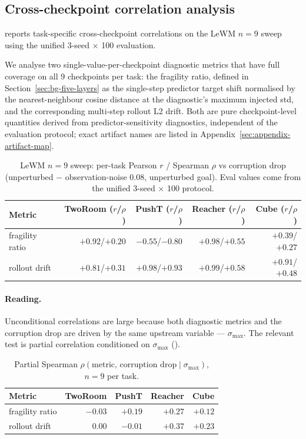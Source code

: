 \documentclass[10pt]{article}
\newcommand{\stdmax}{\ensuremath{\sigma_{\max}}}
\newcommand{\fragility}{fragility ratio}
\begin{document}
\subsection{Cross-checkpoint correlation analysis}\label{sec:diag-cross}

 reports task-specific cross-checkpoint correlations on the LeWM $n = 9$ sweep using the unified 3-seed $\times$ 100 evaluation.

We analyse two single-value-per-checkpoint diagnostic metrics that have full coverage on all 9 checkpoints per task: the \fragility{}, defined in Section~\ref{sec:bg-five-layers} as the single-step predictor target shift normalised by the nearest-neighbour cosine distance at the diagnostic's maximum injected std, and the corresponding multi-step rollout L2 drift. Both are pure checkpoint-level quantities derived from predictor-sensitivity diagnostics, independent of the evaluation protocol; exact artifact names are listed in Appendix~\ref{sec:appendix-artifact-map}.

\begin{table}[tbp]
\centering
\caption{LeWM $n = 9$ sweep: per-task Pearson $r$ / Spearman $\rho$ vs corruption drop (unperturbed $-$ observation-noise 0.08, unperturbed goal). Eval values come from the unified 3-seed $\times$ 100 protocol.}
\label{tab:corr-n9}
\small
\setlength{\tabcolsep}{4pt}
\begin{tabular}{lrrrr}
\toprule
Metric & TwoRoom ($r$/$\rho$) & PushT ($r$/$\rho$) & Reacher ($r$/$\rho$) & Cube ($r$/$\rho$) \\
\midrule
\fragility{} & $+0.92$/$+0.20$ & $-0.55$/$-0.80$ & $+0.98$/$+0.55$ & $+0.39$/$+0.27$ \\
rollout drift & $+0.81$/$+0.31$ & $+0.98$/$+0.93$ & $+0.99$/$+0.58$ & $+0.91$/$+0.48$ \\
\bottomrule
\end{tabular}
\end{table}

\paragraph{Reading.} Unconditional correlations are large because both diagnostic metrics and the corruption drop are driven by the same upstream variable --- \stdmax{}. The relevant test is partial correlation conditioned on \stdmax{} ().

\begin{table}[tbp]
\centering
\caption{Partial Spearman $\rho(\text{metric},\,\text{corruption drop} \mid \stdmax{})$, $n = 9$ per task.}
\label{tab:partial-corr-4tasks}
\small
\setlength{\tabcolsep}{4pt}
\begin{tabular}{lrrrr}
\toprule
Metric & TwoRoom & PushT & Reacher & Cube \\
\midrule
\fragility{} & $-0.03$ & $+0.19$ & $+0.27$ & $+0.12$ \\
rollout drift & $\phantom{+}0.00$ & $-0.01$ & $+0.37$ & $+0.23$ \\
\bottomrule
\end{tabular}
\end{table}
\end{document}
